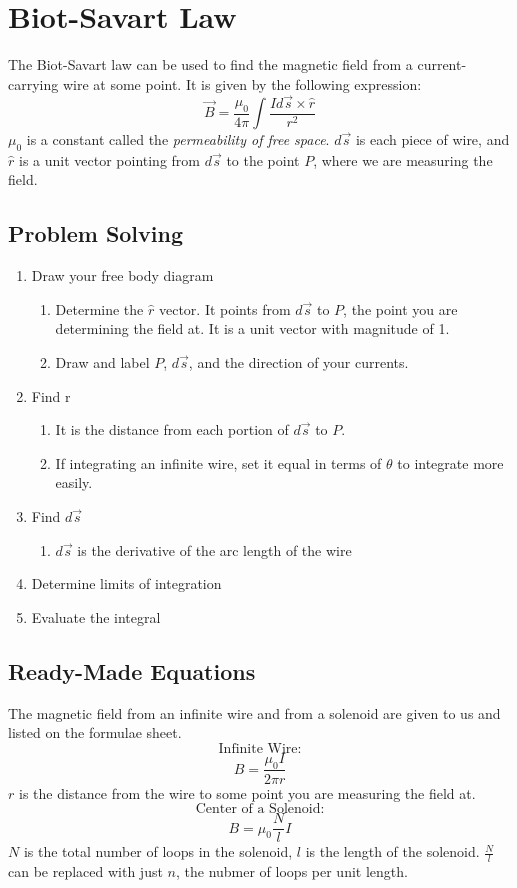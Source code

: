 \documentclass{article}
\begin{document}
\section{Biot-Savart Law}
The Biot-Savart law can be used to find the magnetic field from a current-carrying wire at some point.  It is given by the following expression:
\[\vec{B} = \frac{\mu_0}{4\pi} \int \frac{Id\vec{s} \times \hat{r}}{r^2} \]
$\mu_0$ is a constant called the \textit{permeability of free space}. $d\vec{s}$ is each piece of wire, and $\hat{r}$ is a unit vector pointing from $d\vec{s}$ to the point $P$, where we are measuring the field.
\subsection{Problem Solving}
\begin{enumerate}
\item Draw your free body diagram
  \begin{enumerate}
  \item Determine the $\hat{r}$ vector.  It points from $d\vec{s}$ to $P$, the point you are determining the field at.  It is a unit vector with magnitude of 1.
  \item Draw and label $P$, $d\vec{s}$, and the direction of your currents.
  \end{enumerate}
\item Find r
  \begin{enumerate}
  \item It is the distance from each portion of $d\vec{s}$ to $P$.
  \item If integrating an infinite wire, set it equal in terms of $\theta$ to integrate more easily.
  \end{enumerate}
\item Find $d\vec{s}$
  \begin{enumerate}
  \item $d\vec{s}$ is the derivative of the arc length of the wire
  \end{enumerate}
\item Determine limits of integration
\item Evaluate the integral
\end{enumerate}
\subsection{Ready-Made Equations}
The magnetic field from an infinite wire and from a solenoid are given to us and listed on the formulae sheet.
\[ \text{Infinite Wire:} \]
\[ B = \frac{\mu_0 I}{2\pi r} \]
$r$ is the distance from the wire to some point you are measuring the field at.
\[ \text{Center of a Solenoid:} \]
\[ B = \mu_0 \frac{N}{l} I  \]
$N$ is the total number of loops in the solenoid, $l$ is the length of the solenoid. $\frac{N}{l}$ can be replaced with just $n$, the nubmer of loops per unit length.
\end{document}
